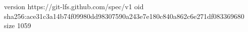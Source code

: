 version https://git-lfs.github.com/spec/v1
oid sha256:ace31c3a14b74f09980dd98307590a243e7e180c840a862c6e271df083369680
size 1059
